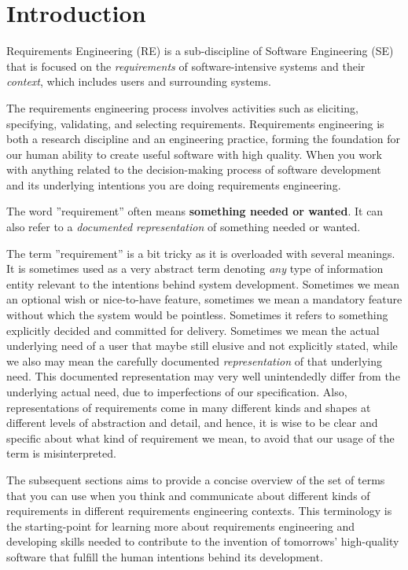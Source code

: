 

\chapter{Introduction}%
\MarginPage{%

}%
Requirements Engineering (RE) is a sub-discipline of Software Engineering (SE) that is focused on the \textit{requirements} of software-intensive systems and their \textit{context}, which includes users and surrounding systems.

The requirements engineering process involves activities such as eliciting, specifying, validating, and selecting requirements. 
Requirements engineering is both a research discipline and an engineering practice, forming the foundation for our human ability to create useful software with high quality. When you work with anything related to the decision-making process of software development and its underlying intentions you are doing requirements engineering.

The word ''requirement'' often means \textbf{something needed or wanted}. It can also refer to a \emph{documented representation} of something needed or wanted. 

The term ''requirement'' is a bit tricky as it is overloaded with several meanings. It is sometimes used as a very abstract term denoting \textit{any} type of information entity relevant to the intentions behind system development.  Sometimes we mean an optional wish or nice-to-have feature, sometimes we mean a mandatory feature without which the system would be pointless. Sometimes it refers to something explicitly decided and committed for delivery. Sometimes we mean the actual underlying need of a user that maybe still elusive and not explicitly stated, while we also may mean the carefully documented \textit{representation} of that underlying need. This documented representation may very well unintendedly differ from the underlying actual need, due to imperfections of our specification. 
Also, representations of requirements come in many different kinds and shapes at different levels of abstraction and detail, and hence, it is wise to be clear and specific about what kind of requirement we mean, to avoid that our usage of the term is misinterpreted. 

The subsequent sections aims to provide a concise overview of the set of terms that you can use when you think and communicate about different kinds of requirements in different requirements engineering contexts. This terminology is the starting-point for learning more about requirements engineering and developing skills needed to contribute to the invention of tomorrows' high-quality software that fulfill the human intentions behind its development.

